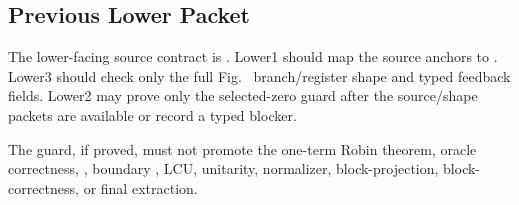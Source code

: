 \subsection{Previous Lower Packet}

The lower-facing source contract is
.
Lower1 should map the source anchors to .
Lower3 should check only the full Fig.~ branch/register
shape and typed feedback fields.  Lower2 may prove only the selected-zero guard
after the source/shape packets are available or record a typed blocker.

The guard, if proved, must not promote the one-term Robin theorem, oracle
correctness, , boundary , LCU, unitarity, normalizer,
block-projection, block-correctness, or final extraction.

